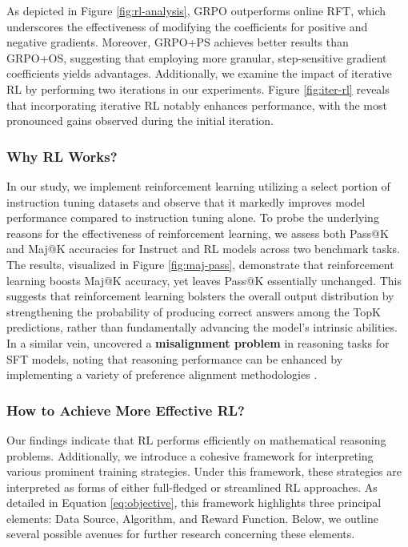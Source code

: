 \begin{itemize}[topsep=0pt]
\begin{itemize}[topsep=0pt]
As depicted in Figure \ref{fig:rl-analysis}, GRPO outperforms online RFT, which underscores the effectiveness of modifying the coefficients for positive and negative gradients. Moreover, GRPO+PS achieves better results than GRPO+OS, suggesting that employing more granular, step-sensitive gradient coefficients yields advantages. Additionally, we examine the impact of iterative RL by performing two iterations in our experiments. Figure \ref{fig:iter-rl} reveals that incorporating iterative RL notably enhances performance, with the most pronounced gains observed during the initial iteration.

\subsubsection{Why RL Works?} In our study, we implement reinforcement learning utilizing a select portion of instruction tuning datasets and observe that it markedly improves model performance compared to instruction tuning alone. To probe the underlying reasons for the effectiveness of reinforcement learning, we assess both Pass@K and Maj@K accuracies for Instruct and RL models across two benchmark tasks. The results, visualized in Figure \ref{fig:maj-pass}, demonstrate that reinforcement learning boosts Maj@K accuracy, yet leaves Pass@K essentially unchanged. This suggests that reinforcement learning bolsters the overall output distribution by strengthening the probability of producing correct answers among the TopK predictions, rather than fundamentally advancing the model’s intrinsic abilities. In a similar vein, \citep{wang2023making} uncovered a \textbf{misalignment problem} in reasoning tasks for SFT models, noting that reasoning performance can be enhanced by implementing a variety of preference alignment methodologies \citep{yuan2023rrhf,song2023preference,wang2023making}.

\subsubsection{How to Achieve More Effective RL?}
\label{sec:effec_rl}
Our findings indicate that RL performs efficiently on mathematical reasoning problems. Additionally, we introduce a cohesive framework for interpreting various prominent training strategies. Under this framework, these strategies are interpreted as forms of either full-fledged or streamlined RL approaches. As detailed in Equation \ref{eq:objective}, this framework highlights three principal elements: Data Source, Algorithm, and Reward Function. Below, we outline several possible avenues for further research concerning these elements.


\end{itemize}
\end{itemize}
